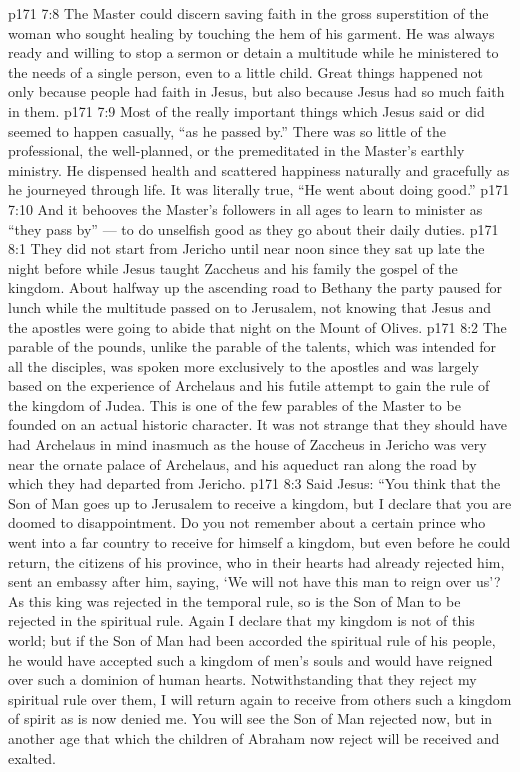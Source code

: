 \vs p171 7:8 The Master could discern saving faith in the gross superstition of the woman who sought healing by touching the hem of his garment. He was always ready and willing to stop a sermon or detain a multitude while he ministered to the needs of a single person, even to a little child. Great things happened not only because people had faith in Jesus, but also because Jesus had so much faith in them.
\vs p171 7:9 Most of the really important things which Jesus said or did seemed to happen casually, “as he passed by.” There was so little of the professional, the well\hyp{}planned, or the premeditated in the Master’s earthly ministry. He dispensed health and scattered happiness naturally and gracefully as he journeyed through life. It was literally true, “He went about doing good.”
\vs p171 7:10 And it behooves the Master’s followers in all ages to learn to minister as “they pass by” --- to do unselfish good as they go about their daily duties.
\vs p171 8:1 They did not start from Jericho until near noon since they sat up late the night before while Jesus taught Zaccheus and his family the gospel of the kingdom. About halfway up the ascending road to Bethany the party paused for lunch while the multitude passed on to Jerusalem, not knowing that Jesus and the apostles were going to abide that night on the Mount of Olives.
\vs p171 8:2 The parable of the pounds, unlike the parable of the talents, which was intended for all the disciples, was spoken more exclusively to the apostles and was largely based on the experience of Archelaus and his futile attempt to gain the rule of the kingdom of Judea. This is one of the few parables of the Master to be founded on an actual historic character. It was not strange that they should have had Archelaus in mind inasmuch as the house of Zaccheus in Jericho was very near the ornate palace of Archelaus, and his aqueduct ran along the road by which they had departed from Jericho.
\vs p171 8:3 \pc Said Jesus: \textcolor{ubdarkred}{“You think that the Son of Man goes up to Jerusalem to receive a kingdom, but I declare that you are doomed to disappointment. Do you not remember about a certain prince who went into a far country to receive for himself a kingdom, but even before he could return, the citizens of his province, who in their hearts had already rejected him, sent an embassy after him, saying, ‘We will not have this man to reign over us’? As this king was rejected in the temporal rule, so is the Son of Man to be rejected in the spiritual rule. Again I declare that my kingdom is not of this world; but if the Son of Man had been accorded the spiritual rule of his people, he would have accepted such a kingdom of men’s souls and would have reigned over such a dominion of human hearts. Notwithstanding that they reject my spiritual rule over them, I will return again to receive from others such a kingdom of spirit as is now denied me. You will see the Son of Man rejected now, but in another age that which the children of Abraham now reject will be received and exalted.}
